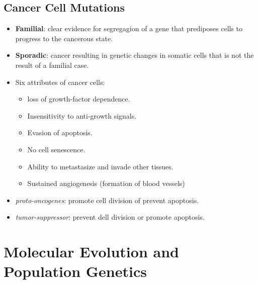 \documentclass[12pt,a4paper]{article}
\begin{document}
\subsection{Cancer Cell Mutations}
\begin{itemize}
    \item \textbf{Familial}: clear evidence for segregagion of a gene that prediposes cells to progress to the cancerous state.
    \item \textbf{Sporadic}: cancer resulting in genetic changes in somatic cells that is not the result of a familial case.
    \item Six attributes of cancer cells:
        \begin{itemize}
            \item loss of growth-factor dependence.
            \item Insensitivity to anti-growth signals.
            \item Evasion of apoptosis.
            \item No cell senescence.
            \item Ability to metastasize and invade other tissues.
            \item Sustained angiogenesis (formation of blood vessels)
        \end{itemize}
    \item \textit{proto-oncogenes}: promote cell division of prevent apoptosis.
    \item \textit{tumor-suppressor}: prevent dell division or promote apoptosis.
\end{itemize}


\clearpage
\section{Molecular Evolution and Population Genetics}
\end{document}
